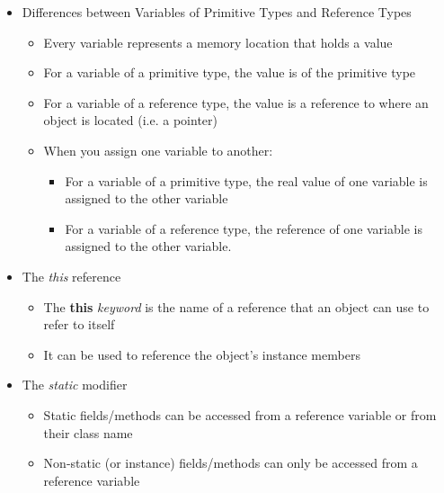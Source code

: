 \begin{itemize}
	\item Differences between Variables of Primitive Types and Reference Types
	\begin{itemize}
		\item Every variable represents a memory location that holds a value
		\item For a variable of a primitive type, the value is of the primitive type
		\item For a variable of a reference type, the value is a reference to where an object is located (i.e. a pointer)
		\item When you assign one variable to another:
		\begin{itemize}
			\item For a variable of a primitive type, the real value of one variable is assigned to
			the other variable
			\item For a variable of a reference type, the reference of one variable is assigned to the other variable.
		\end{itemize}
	\end{itemize}

	\item The \textit{this} reference
	\begin{itemize}
		\item The \textbf{this} \textit{keyword} is the name of a reference that an object can use to
		refer to itself
		\item It can be used to reference the object’s instance members
	\end{itemize}

	\item The \textit{static} modifier
	\begin{itemize}
		\item Static fields/methods can be accessed from a reference variable or
		from their class name
		\item Non-static (or instance) fields/methods can only be accessed from a reference variable
	\end{itemize}


\end{itemize}
